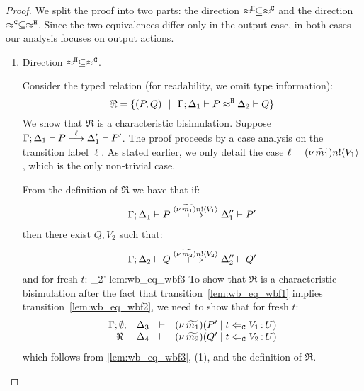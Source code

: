 \begin{proof}
	\noi
	We split the proof into two parts: the direction
	$\approx^\mathtt{H} \subseteq \approx^\mathtt{C}$ and the direction
	$\approx^\mathtt{C} \subseteq \approx^\mathtt{H}$.
 Since the two equivalences differ only in the output case, in both cases our analysis focuses on output actions.

	\begin{enumerate}[1.]
		\item	Direction $\approx^\mathtt{H} \subseteq \approx^\mathtt{C}$.

				\noi Consider the typed relation (for readability, we omit type information):
				\[
					\Re = \{
								(P, Q) 
								\ \ |\ \ 
								\Gamma; \Delta_1 \vdash P \approx^\mathtt{H} \Delta_2 \vdash Q\}
				\]
				We show that $\Re$ is a characteristic bisimulation.
				Suppose
				$
						\Gamma; \Delta_1 \vdash P \stackrel{ \ell}{\longmapsto} \Delta_1' \vdash P'
				$.
				The proof proceeds by a case analysis on the transition label $\ell$.
				As stated earlier, we only detail the case 
				$\ell = (\nu\, \widetilde{m_1}) n ! \langle V_1 \rangle$, which is the only non-trivial case.

							\smallskip
							
							 From the definition of $\Re$ we have that if:
							\begin{eqnarray}
								\Gamma; \Delta_1 \vdash P \stackrel{(\nu\, \widetilde{m_1}) n ! \langle V_1 \rangle}{\longmapsto} \Delta_1'' \vdash P'
								\label{lem:wb_eq_wbf1}
							\end{eqnarray}
							then there exist $Q, V_2$ such that:
							\begin{eqnarray}
								\horel{\Gamma}{\Delta_2}{Q}{\Hby{\news{\widetilde{m_2}} \bactout{n}{V_2}}}{\Delta_2''}{Q'}
								\label{lem:wb_eq_wbf2}
							\end{eqnarray}
							and for fresh $t$:
								{\hwb}
								{\Delta_2'}{}
								{lem:wb_eq_wbf3}
							\noi 
							To show that $\Re$ is a characteristic bisimulation
							after the fact that transition~\eqref{lem:wb_eq_wbf1} implies transition~\eqref{lem:wb_eq_wbf2},
							we need to show that for fresh $t$:
							\begin{eqnarray}
								\begin{array}{rcll} \Gamma; \emptyset; &\Delta_3& \vdash& (\nu\, \widetilde{m_1})(P' \;|\; t \Leftarrow_{\mathtt{C}} V_1{\,:\,}U)\\ \ \Re\  &\Delta_4& \vdash &  (\nu\, \widetilde{m_2})(Q' \;|\; t \Leftarrow_{\mathtt{C}} V_2{\,:\,}U) \end{array}
								\label{lem:wb_eq_wbf4}
							\end{eqnarray}
							\noi which follows from \eqref{lem:wb_eq_wbf3}, (1),
							and the definition of $\Re$.


\end{enumerate}
\end{proof}
